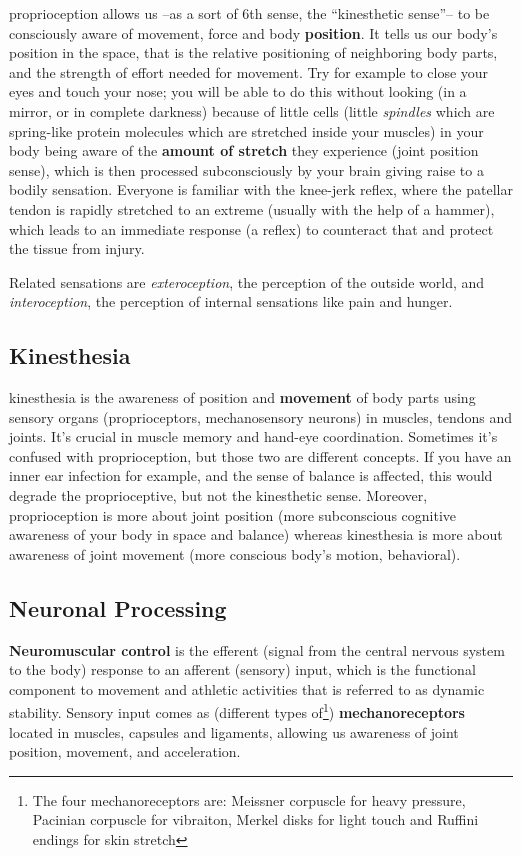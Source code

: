 \Gls{proprioception} allows us --as a sort of 6th sense, the ``kinesthetic sense''-- to be consciously aware of movement, force and body \textbf{position}.
It tells us our body's position in the space, that is the relative positioning of neighboring body parts, and the strength of effort needed for movement.
Try for example to close your eyes and touch your nose; you will be able to do this without looking (in a mirror, or in complete darkness) because of little cells (little \textit{spindles} which are spring-like protein molecules which are stretched inside your muscles) in your body being aware of the \textbf{amount of stretch} they experience (joint position sense), which is then processed subconsciously by your brain giving raise to a bodily sensation.
Everyone is familiar with the knee-jerk reflex, where the patellar tendon is rapidly stretched to an extreme (usually with the help of a hammer), which leads to an immediate response (a reflex) to counteract that and protect the tissue from injury.

Related sensations are \textit{exteroception}, the perception of the outside world, and \textit{interoception}, the perception of internal sensations like pain and hunger.

\subsection{Kinesthesia}\label{subsec:kinesthesia}

\Gls{kinesthesia} is the awareness of position and \textbf{movement} of body parts using sensory organs (proprioceptors, mechanosensory neurons) in muscles, tendons and joints.
It's crucial in muscle memory and hand-eye coordination.
Sometimes it's confused with proprioception, but those two are different concepts.
If you have an inner ear infection for example, and the sense of balance is affected, this would degrade the proprioceptive, but not the kinesthetic sense.
Moreover, proprioception is more about joint position (more subconscious cognitive awareness of your body in space and balance) whereas kinesthesia is more about awareness of joint movement (more conscious body's motion, behavioral).

\subsection{Neuronal Processing}\label{subsec:neuronal-processing}

\textbf{Neuromuscular control} is the efferent (signal from the central nervous system to the body) response to an afferent (sensory) input, which is the functional component to movement and athletic activities that is referred to as dynamic stability.
Sensory input comes as (different types of\footnote{The four mechanoreceptors are: Meissner corpuscle for heavy pressure, Pacinian corpuscle for vibraiton, Merkel disks for light touch and Ruffini endings for skin stretch}) \textbf{mechanoreceptors} located in muscles, capsules and ligaments, allowing us awareness of joint position, movement, and acceleration.


